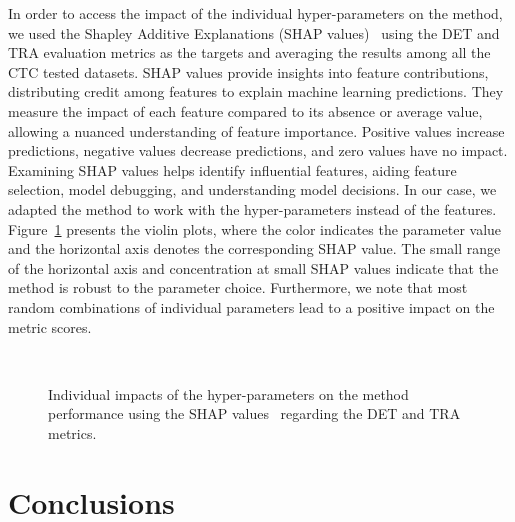 \documentclass{article}
\begin{document}
In order to access the impact of the individual hyper-parameters on the method, we used the Shapley Additive Explanations (SHAP values)~\cite{shap,shap_plot} using the DET and TRA evaluation metrics as the targets and averaging the results among all the CTC tested datasets. SHAP values provide insights into feature contributions, distributing credit among features to explain machine learning predictions. They measure the impact of each feature compared to its absence or average value, allowing a nuanced understanding of feature importance. Positive values increase predictions, negative values decrease predictions, and zero values have no impact. Examining SHAP values helps identify influential features, aiding feature selection, model debugging, and understanding model decisions. In our case, we adapted the method to work with the hyper-parameters instead of the features. Figure~\ref{fig:SHAP} presents the violin plots, where the color indicates the parameter value and the horizontal axis denotes the corresponding SHAP value. The small range of the horizontal axis and concentration at small SHAP values indicate that the method is robust to the parameter choice. Furthermore, we note that most random combinations of individual parameters lead to a positive impact on the metric scores. 

\begin{figure}[]
\centering
{} ~
\caption[Individual impacts of the hyper-parameters on the method performance using the SHAP values regarding the DET and TRA metrics.]{Individual impacts of the hyper-parameters on the method performance using the SHAP values~\cite{shap,shap_plot} regarding the DET and TRA metrics.}
\label{fig:SHAP}
\end{figure}

\section{Conclusions}
\end{document}
